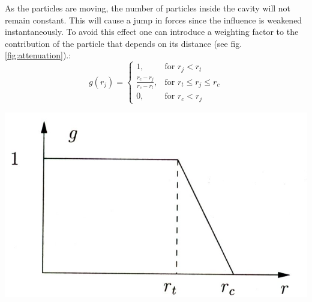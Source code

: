 \vspace{0.2cm}
\noindent
\begin{minipage}{\textwidth}
\begin{minipage}{.45\textwidth}
As the particles are moving, the number of particles inside the cavity will not remain constant. This will cause a jump in forces since the influence is weakened instantaneously. To avoid this effect one can introduce a weighting factor to the contribution of the particle that depends on its distance (see fig.\ref{fig:attenuation}).:
\begin{equation}
g(r_j)=\begin{cases}
  1,  & \text{for }r_j<r_t\\
  \frac{r_c-r_j}{r_c-r_t}, & \text{for }r_t \le r_j \le r_c \\
	0 , & \text{for }r_c < r_j
\end{cases}
\end{equation}

\end{minipage}\hfill
\begin{minipage}{.5\textwidth}
  \centering
  \includegraphics[width=\textwidth]{pics/attenuation}
  \label{fig:attenuation}
\end{minipage}
\end{minipage}
\vspace{0.1cm}










